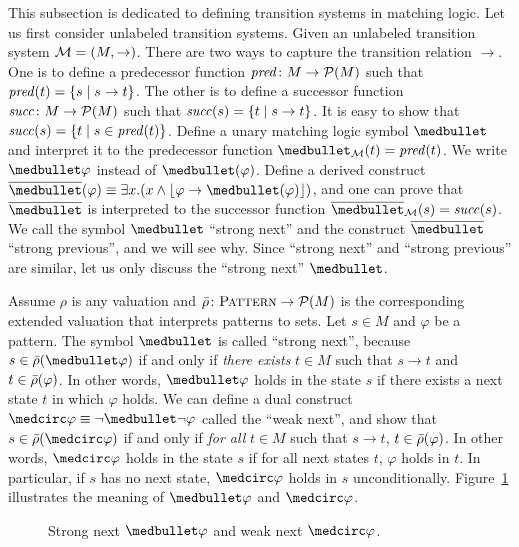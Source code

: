\documentclass{amsart}
\begin{document}
This subsection is dedicated to defining transition systems in matching logic.
Let us first consider unlabeled transition systems.
Given an unlabeled transition system $\mathcal{M} = (M,\to)$.
There are two ways to capture the transition relation $\to$.
One is to define a predecessor function $\mathit{pred} \colon M \to \mathcal{P}(M)$
such that $\mathit{pred}(t) = \{s \mid s \to t\}$.
The other is to define a successor function $\mathit{succ} \colon M\to \mathcal{P}(M)$
such that $\mathit{succ}(s) = \{ t \mid s \to t \}$.
It is easy to show that $\mathit{succ}(s) = \{ t \mid s \in \mathit{pred}(t) \}$.
Define a unary matching logic symbol $\snext$
and interpret it to the predecessor function $\snext_\MM(t) = \pred(t)$.
We write $\snext \varphi$ instead of $\snext(\varphi)$.
Define a derived construct
$\sprev(\varphi) \equiv \exists x . (x \wedge \floor{\varphi \imp \snext(\varphi)})$,
and one can prove that $\sprev$ is interpreted to the successor function
$\sprev_\MM(s) = \succc(s)$.
We call the symbol $\snext$ ``strong next'' and the construct $\sprev$ ``strong previous'',
and we will see why.
Since ``strong next'' and ``strong previous'' are similar, let us only discuss
the ``strong next'' $\snext$.

Assume $\rho$ is any valuation
and $\bar{\rho} \colon \textnormal{\textsc{Pattern}} \to \mathcal{P}(M)$ is the corresponding extended valuation
that interprets patterns to sets.
Let $s \in M$ and $\varphi$ be a pattern.
The symbol $\snext$ is called ``strong next'', because
$s \in \barrho(\snext \varphi)$ if and only if  \emph{there exists} $t \in M$ such that
$s \to t$ and $t \in \bar{\rho}(\varphi)$.
In other words, $\snext \varphi$ holds in the state $s$ if
there exists a next state $t$ in which $\varphi$ holds.
We can define a dual construct $\wnext \varphi \equiv \neg \snext \neg \varphi$
called the ``weak next'', and show that
$s \in \barrho(\wnext \varphi)$ if and only if
\emph{for all} $t \in M$ such that $s \to t$, $t \in \bar{\rho}(\varphi)$.
In other words, $\wnext \varphi$ holds in the state $s$ if
for all next states $t$, $\varphi$ holds in $t$.
In particular, if $s$ has no next state, $\wnext \varphi$ holds in $s$ unconditionally.
Figure~\ref{fig_snext_wnext} illustrates the meaning of $\snext \varphi$ and $\wnext \varphi$.
\begin{figure}
\caption{Strong next $\snext \varphi$ and weak next $\wnext \varphi$.}
\label{fig_snext_wnext}
\end{figure}
\end{document}
